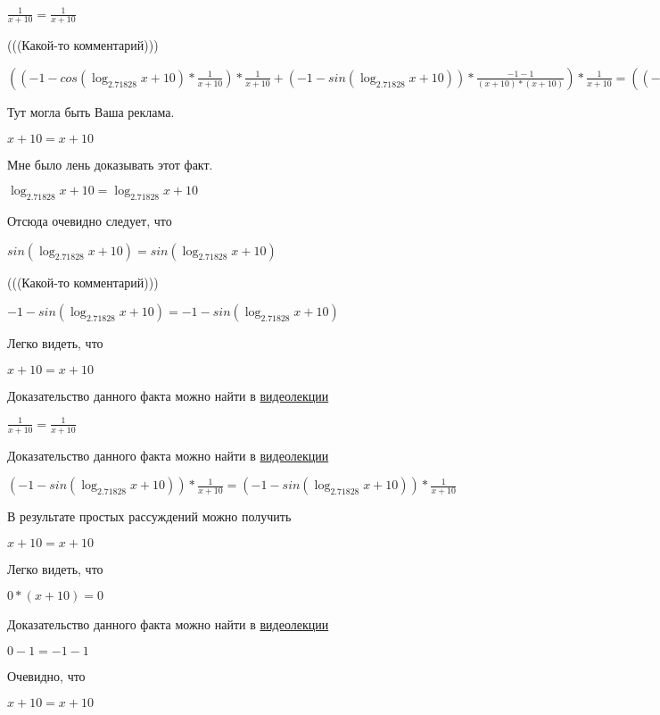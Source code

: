 \documentclass[12pt,a4paper,fleqn]{article}
\theoremstyle{definition}
\begin{document}
$\frac{ 1 }{ x  +  10 }
 = \frac{ 1 }{ x  +  10 }
$

(((Какой-то комментарий)))

$(( -1  - cos(\log_{ 2.71828 }{ x  +  10 }) * \frac{ 1 }{ x  +  10 }
) * \frac{ 1 }{ x  +  10 }
 + ( -1  - sin(\log_{ 2.71828 }{ x  +  10 })) * \frac{ -1  -  1 }{( x  +  10 ) * ( x  +  10 )}
) * \frac{ 1 }{ x  +  10 }
 = (( -1  - cos(\log_{ 2.71828 }{ x  +  10 }) * \frac{ 1 }{ x  +  10 }
) * \frac{ 1 }{ x  +  10 }
 + ( -1  - sin(\log_{ 2.71828 }{ x  +  10 })) * \frac{ -1  -  1 }{( x  +  10 ) * ( x  +  10 )}
) * \frac{ 1 }{ x  +  10 }
$

Тут могла быть Ваша реклама.

$ x  +  10  =  x  +  10 $

Мне было лень доказывать этот факт.

$\log_{ 2.71828 }{ x  +  10 } = \log_{ 2.71828 }{ x  +  10 }$

Отсюда очевидно следует, что

$sin(\log_{ 2.71828 }{ x  +  10 }) = sin(\log_{ 2.71828 }{ x  +  10 })$

(((Какой-то комментарий)))

$ -1  - sin(\log_{ 2.71828 }{ x  +  10 }) =  -1  - sin(\log_{ 2.71828 }{ x  +  10 })$

Легко видеть, что

$ x  +  10  =  x  +  10 $

Доказательство данного факта можно найти в \href{https://www.youtube.com/watch?v=dQw4w9WgXcQ}{видеолекции}

$\frac{ 1 }{ x  +  10 }
 = \frac{ 1 }{ x  +  10 }
$

Доказательство данного факта можно найти в \href{https://www.youtube.com/watch?v=dQw4w9WgXcQ}{видеолекции}

$( -1  - sin(\log_{ 2.71828 }{ x  +  10 })) * \frac{ 1 }{ x  +  10 }
 = ( -1  - sin(\log_{ 2.71828 }{ x  +  10 })) * \frac{ 1 }{ x  +  10 }
$

В результате простых рассуждений можно получить

$ x  +  10  =  x  +  10 $

Легко видеть, что

$ 0  * ( x  +  10 ) =  0 $

Доказательство данного факта можно найти в \href{https://www.youtube.com/watch?v=dQw4w9WgXcQ}{видеолекции}

$ 0  -  1  =  -1  -  1 $

Очевидно, что

$ x  +  10  =  x  +  10 $
\end{document}
